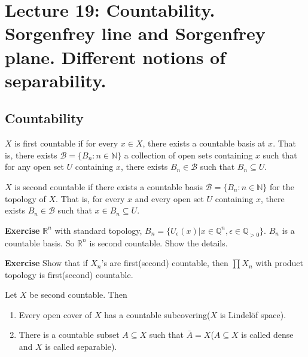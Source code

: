 \documentclass[main.tex]{subfiles}
\begin{document}
\pagestyle{plain}
\setcounter{chapter}{18}

\chapter{Lecture 19: Countability. Sorgenfrey line and Sorgenfrey plane. Different notions of separability. }
\label{chap:chapter19}

\section{Countability} 
\begin{definition}
    $X$ is first countable if for every $x\in X$, there exists a countable basis at $x$. That is, there exists $\mathcal{B} = \{B_n: n \in \mathbb{N}\}$ a collection of open sets containing $x$ such that for any open set $U$ containing $x$, there exists $B_n \in \mathcal{B}$ such that $B_n \subseteq U$.
\end{definition}

\begin{definition}
    $X$ is second countable if there exists a countable basis $\mathcal{B} = \{B_n: n \in \mathbb{N}\}$ for the topology of $X$. That is, for every $x$ and every open set $U$ containing $x$, there exists $B_n \in \mathcal{B}$ such that $x \in B_n \subseteq U$. 
\end{definition}

\par \noindent \textbf{Exercise} $\mathbb{R}^n$ with standard topology, $B_n = \{U_{\epsilon}(x)| x\in \mathbb{Q}^n, \epsilon \in \mathbb{Q}_{>0}\}$. $B_n$ is a countable basis. So $\mathbb{R}^n$ is second countable. Show the details. 

\par \noindent \textbf{Exercise} Show that if $X_n$'s are first(second) countable, then $\prod X_n$ with product topology is first(second) countable.

\begin{theorem}
    Let $X$ be second countable. Then 
    \begin{enumerate}
        \item Every open cover of $X$ has a countable subcovering($X$ is Lindelöf space).
        \item There is a countable subset $A \subseteq X$ such that $\bar{A} = X$($A \subseteq X$ is called dense and $X$ is called separable). 
    \end{enumerate}
\end{theorem}
\end{document}
